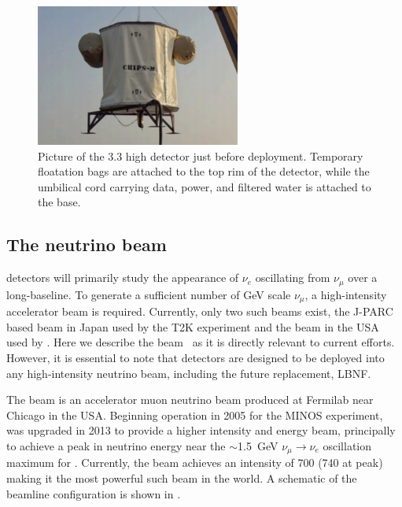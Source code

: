 \begin{figure} %
    \includegraphics[width=0.6\textwidth]{diagrams/4-chips/chips_m.pdf}
    \caption[Picture of the \chipsm detector just before deployment]
    {Picture of the \SI{3.3}{} high \chipsm detector just before deployment. Temporary
        floatation bags are attached to the top rim of the detector, while the umbilical cord
        carrying data, power, and filtered water is attached to the base.}
    \label{fig:chips_m}
\end{figure}

\subsection{The neutrino beam} %
\label{sec:chips_concept_beam} %

\chips detectors will primarily study the appearance of $\nu_{e}$ oscillating from $\nu_{\mu}$
over a long-baseline. To generate a sufficient number of GeV scale $\nu_{\mu}$, a high-intensity
accelerator beam is required. Currently, only two such beams exist, the J-PARC based beam in Japan
used by the T2K experiment and the \numi beam in the USA used by \nova. Here we describe the \numi
beam~\cite{adamson2016} as it is directly relevant to current \chips efforts. However, it is
essential to note that \chips detectors are designed to be deployed into any high-intensity
neutrino beam, including the future \numi replacement, LBNF.

The \numi beam is an accelerator muon neutrino beam produced at Fermilab near Chicago in the USA.
Beginning operation in 2005 for the MINOS experiment, \numi was upgraded in 2013 to provide a
higher intensity and energy beam, principally to achieve a peak in neutrino energy near the
$\sim$\SI{1.5}{\GeV} $\nu_{\mu}\rightarrow\nu_{e}$ oscillation maximum for \nova. Currently, the
\numi beam achieves an intensity of \SI{700}{} (\SI{740}{} at peak) making it
the most powerful such beam in the world. A schematic of the \numi beamline configuration is shown
in .

